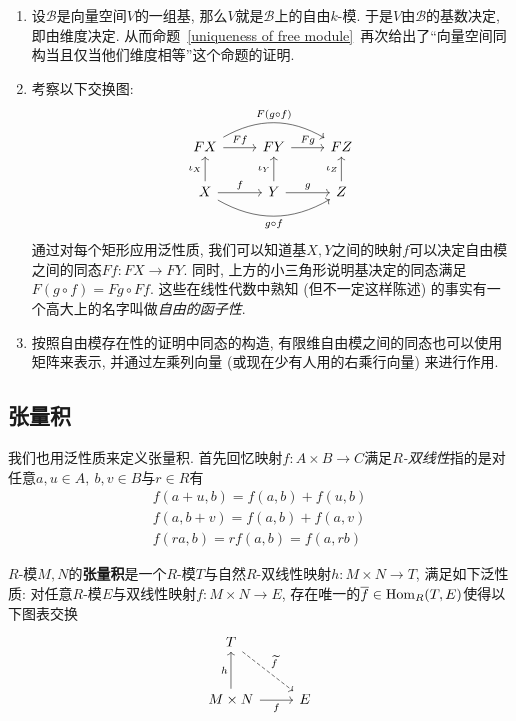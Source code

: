 \begin{eg}
    \begin{enumerate}[(1)]
        \item 设$\mathcal{B}$是向量空间$V$的一组基, 那么$V$就是$\mathcal{B}$上的自由$k$-模.
        于是$V$由$\mathcal{B}$的基数决定, 即由维度决定.
        从而命题~\ref{uniqueness of free module}~再次给出了``向量空间同构当且仅当他们维度相等''这个命题的证明.
        \item 考察以下交换图:
        \[\begin{tikzcd}
            FX \arrow[rr, bend left, "F(g\circ f)"] \arrow[r, "Ff"] & FY \arrow[r, "Fg"] & FZ\\
            X \arrow[u, "\iota_X"] \arrow[r, "f"] \arrow[rr,bend right, "g\circ f"'] & Y \arrow[u, "\iota_Y"] \arrow[r, "g"] & Z \arrow[u, "\iota_Z"]
        \end{tikzcd}\]
        通过对每个矩形应用泛性质, 我们可以知道基$X,Y$之间的映射$f$可以决定自由模之间的同态$Ff:FX\to FY$.
        同时, 上方的小三角形说明基决定的同态满足$F(g\circ f)=Fg\circ Ff$.
        这些在线性代数中熟知 (但不一定这样陈述) 的事实有一个高大上的名字叫做\textit{自由的函子性}.
        \item 按照自由模存在性的证明中同态的构造, 有限维自由模之间的同态也可以使用矩阵来表示, 并通过左乘列向量 (或现在少有人用的右乘行向量) 来进行作用.
    \end{enumerate}
\end{eg}

\subsection*{张量积}
我们也用泛性质来定义张量积.
首先回忆映射$f:A\times B\to C$满足\textit{$R$-双线性}指的是对任意$a,u\in A,\ b,v\in B$与$r\in R$有
\begin{gather*}
    f(a+u,b)=f(a,b)+f(u,b)\\
    f(a,b+v)=f(a,b)+f(a,v)\\
    f(ra,b)=rf(a,b)=f(a,rb)
\end{gather*}

\begin{defn}
    $R$-模$M,N$的\textbf{张量积}是一个$R$-模$T$与自然$R$-双线性映射$h:M\times N\to T$, 满足如下泛性质:
    对任意$R$-模$E$与双线性映射$f:M\times N\to E$, 存在唯一的$\overline{f}\in\operatorname{Hom}_R(T,E)$使得以下图表交换
    \[\begin{tikzcd}[row sep=large]
        T \arrow[rd, dashed, "\widetilde{f}"] & \\
        M\times N\arrow[r, "f"'] \arrow[u, "h"] & E
    \end{tikzcd}\]
\end{defn}


